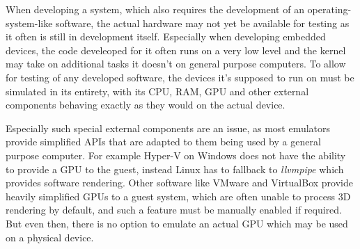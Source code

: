 When developing a system, which also requires the development of an operating-system-like
software, the actual hardware may not yet be available for testing
as it often is still in development itself.
Especially when developing embedded devices,
the code develeoped for it often runs on a very low level
and the kernel may take on additional tasks it doesn't on general purpose computers.
To allow for testing of any developed software,
the devices it's supposed to run on must be simulated in its entirety,
with its CPU, RAM, GPU and other external components behaving exactly as they would on the actual device.

Especially such special external components are an issue,
as most emulators provide simplified APIs that are adapted to them being used by a general purpose computer.
For example Hyper-V on Windows does not have the ability to provide a GPU to the guest,
instead Linux has to fallback to \emph{llvmpipe} which provides software rendering.
Other software like VMware and VirtualBox provide heavily simplified GPUs to a guest system,
which are often unable to process 3D rendering by default,
and such a feature must be manually enabled if required.
But even then, there is no option to emulate an actual GPU which may be used on a physical device.